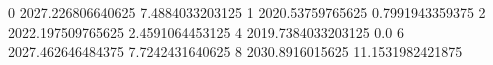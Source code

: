 0 2027.226806640625 7.4884033203125
1 2020.53759765625 0.7991943359375
2 2022.197509765625 2.4591064453125
4 2019.7384033203125 0.0
6 2027.462646484375 7.7242431640625
8 2030.8916015625 11.1531982421875
